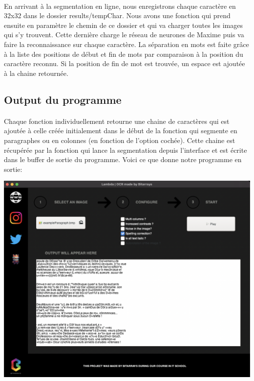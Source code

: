 \documentclass{article}
\begin{document}
\paragraph{}En arrivant à la segmentation en ligne, nous enregistrons chaque caractère en 32x32 dans le dossier results/tempChar. Nous avons une fonction qui prend ensuite en paramètre le chemin de ce dossier et qui va charger toutes les images qui s'y trouvent. Cette dernière charge le réseau de neurones de Maxime puis va faire la reconnaissance sur chaque caractère. La séparation en mots est faite grâce à la liste des positions de début et fin de mots par comparaison à la position du caractère reconnu. Si la position de fin de mot est trouvée, un espace est ajoutée à la chaine retournée.

\subsection{Output du programme}

\paragraph{}Chaque fonction individuellement retourne une chaine de caractères qui est ajoutée à celle créée initialement dans le début de la fonction qui segmente en paragraphes ou en colonnes (en fonction de l'option cochée). Cette chaine est récupérée par la fonction qui lance la segmentation depuis l'interface et est écrite dans le buffer de sortie du programme. Voici ce que donne notre programme en sortie:

\begin{center}
	\includegraphics[scale=0.24]{output}
\end{center}
\end{document}

